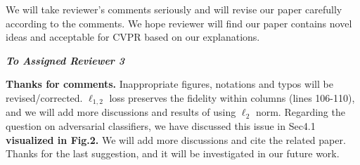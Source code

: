 \documentclass[10pt,twocolumn,letterpaper]{article}
\begin{document}
We will take reviewer's comments seriously and will revise our paper carefully according to the comments.
We hope reviewer will find our paper contains novel ideas and acceptable for CVPR based on our explanations.

\noindent\emph{\textbf{To Assigned Reviewer 3}}

\textbf{Thanks for comments.}
Inappropriate figures, notations and typos will be revised/corrected.
$\ell_{1,2}$ loss preserves the fidelity within columns (lines 106-110),
and we will add more discussions and results of using $\ell_{2}$ norm.
Regarding the question on adversarial classifiers, we have discussed this issue in Sec4.1 \textbf{visualized in Fig.2.}
We will add more discussions and cite the related paper.
Thanks for the last suggestion, and it will be investigated in our future work.
\end{document}
